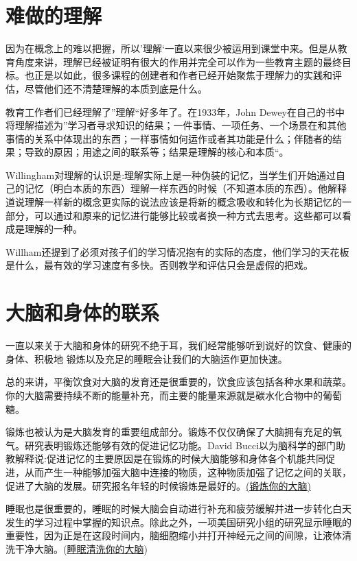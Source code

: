 \section{难做的理解}
    因为在概念上的难以把握，所以’理解‘一直以来很少被运用到课堂中来。但是从教育角度来讲，理解已经被证明有很大的作用并完全可以作为一些教育主题的最终目标。也正是以如此，很多课程的创建者和作者已经开始聚焦于理解力的实践和评估，尽管他们还不清楚理解的本质到底是什么。\par
    教育工作者们已经理解了”理解“好多年了。在1933年，John Dewey在自己的书中将理解描述为”学习者寻求知识的结果；一件事情、一项任务、一个场景在和其他事情的关系中体现出的东西；一样事情如何运作或者其功能是什么；伴随者的结果；导致的原因；用途之间的联系等；结果是理解的核心和本质“。\par
    Willingham对理解的认识是:理解实际上是一种伪装的记忆，当学生们开始通过自己的记忆（明白本质的东西）理解一样东西的时候（不知道本质的东西）。他解释道说理解一样新的概念更实际的说法应该是将新的概念吸收和转化为长期记忆的一部分，可以通过和原来的记忆进行能够比较或者换一种方式去思考。这些都可以看成是理解的一种。\par
    Willham还提到了必须对孩子们的学习情况抱有的实际的态度，他们学习的天花板是什么，最有效的学习速度有多快。否则教学和评估只会是虚假的把戏。\par

\section{大脑和身体的联系}
    一直以来关于大脑和身体的研究不绝于耳，我们经常能够听到说好的饮食、健康的身体、积极地 锻炼以及充足的睡眠会让我们的大脑运作更加快速。\par
    总的来讲，平衡饮食对大脑的发育还是很重要的，饮食应该包括各种水果和蔬菜。你的大脑需要持续不断的能量补充，而主要的能量来源就是碳水化合物中的葡萄糖。\par
    锻炼也被认为是大脑发育的重要组成部分。锻炼不仅仅确保了大脑拥有充足的氧气。研究表明锻炼还能够有效的促进记忆功能。David Bucci以为脑科学的部门助教解释说:促进记忆的主要原因是在锻炼的时候大脑能够和身体各个机能共同促进，从而产生一种能够加强大脑中连接的物质，这种物质加强了记忆之间的关联，促进了大脑的发展。研究报名年轻的时候锻炼是最好的。\href{http://www.medicalnewstoday.com/}{(锻炼你的大脑)} \par
    睡眠也是很重要的，睡眠的时候大脑会自动进行补充和疲劳缓解并进一步转化白天发生的学习过程中掌握的知识点。除此之外，一项美国研究小组的研究显示睡眠的重要性，因为正是在这段时间内，脑细胞缩小并打开神经元之间的间隙，让液体清洗干净大脑。(\href{http://www.bbc.co.uk/news/health-24567412}{睡眠清洗你的大脑})\par

